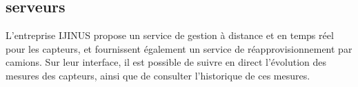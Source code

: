 \subsection{serveurs}

L'entreprise IJINUS propose un service de gestion à distance et en temps
réel pour les capteurs, et fournissent également un service de
réapprovisionnement par camions.
Sur leur interface, il est possible de suivre en direct l'évolution des
mesures des capteurs, ainsi que de consulter l'historique de ces mesures.
